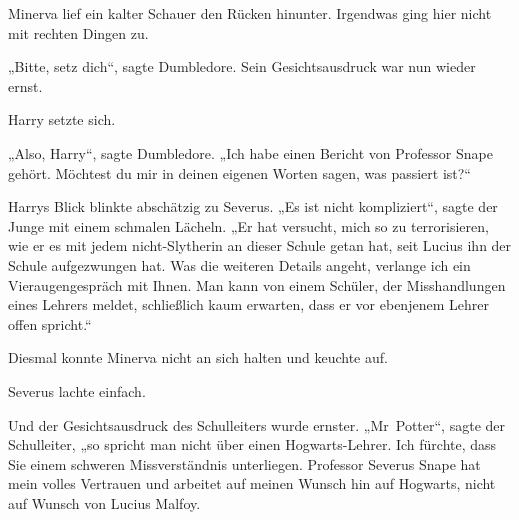 Minerva lief ein kalter Schauer den Rücken hinunter. Irgendwas ging hier nicht mit rechten Dingen zu.

„Bitte, setz dich“, sagte Dumbledore. Sein Gesichtsausdruck war nun wieder ernst.

Harry setzte sich.

„Also, Harry“, sagte Dumbledore. „Ich habe einen Bericht von Professor Snape gehört. Möchtest du mir in deinen eigenen Worten sagen, was passiert ist?“

Harrys Blick blinkte abschätzig zu Severus. „Es ist nicht kompliziert“, sagte der Junge mit einem schmalen Lächeln. „Er hat versucht, mich so zu terrorisieren, wie er es mit jedem nicht-Slytherin an dieser Schule getan hat, seit Lucius ihn der Schule aufgezwungen hat. Was die weiteren Details angeht, verlange ich ein Vieraugengespräch mit Ihnen. Man kann von einem Schüler, der Misshandlungen eines Lehrers meldet, schließlich kaum erwarten, dass er vor ebenjenem Lehrer offen spricht.“

Diesmal konnte Minerva nicht an sich halten und keuchte auf.

Severus lachte einfach.

Und der Gesichtsausdruck des Schulleiters wurde ernster. „Mr~Potter“, sagte der Schulleiter, „so spricht man nicht über einen Hogwarts-Lehrer. Ich fürchte, dass Sie einem schweren Missverständnis unterliegen. Professor Severus Snape hat mein volles Vertrauen und arbeitet auf meinen Wunsch hin auf Hogwarts, nicht auf Wunsch von Lucius Malfoy.

